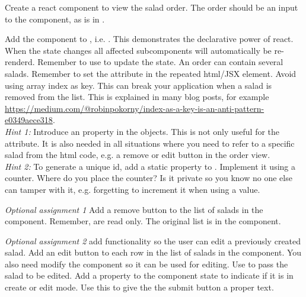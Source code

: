 \documentclass[fleqn, article, a4paper]{memoir}
\begin{document}
\begin{Assignments}
\item Create a react component to view the salad order. The order should be an input to the component, as  is in .

\item Add the  component to , i.e. . This demonstrates the declarative power of react. When the state changes all affected subcomponents will automatically be re-renderd. Remember to use  to update the state.
\newline
\newline
An order can contain several salads. Remember to set the  attribute in the repeated html/JSX element. Avoid using array index as key. This can break your application when a salad is removed from the list. This is explained in many blog posts, for example \url{https://medium.com/@robinpokorny/index-as-a-key-is-an-anti-pattern-e0349aece318}.
\\ \noindent \emph{Hint 1:} Introduce an  property in the  objects. This is not only useful for the  attribute. It is also needed in all situations where you need to refer to a specific salad from the html code, e.g. a remove or edit button in the order view. 
\\ \noindent \emph{Hint 2:} To generate a unique id, add a static  property to . Implement it using a  counter. Where do you place the counter? Is it private so you know no one else can tamper with it, e.g. forgetting to increment it when using a value.

\item \emph{Optional assignment 1} Add a remove button to the list of salads in the  component. Remember,  are read only. The original list is in the  component.

\item \emph{Optional assignment 2}  add functionality so the user can edit a previously created salad. Add an edit button to each row in the list of salads in the  component. You also need modify the  component so it can be used for editing. Use  to pass the salad to be edited. Add a property to the component state to indicate if it is in create or edit mode. Use this to give the the submit button a proper text.


\end{Assignments}
\end{document}
